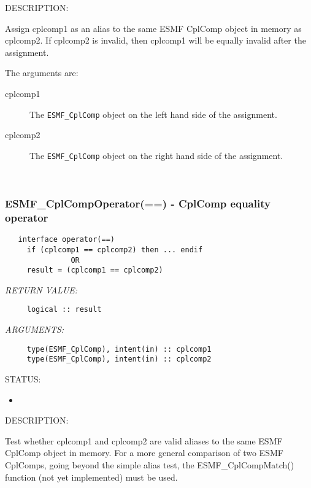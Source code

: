 {\sf DESCRIPTION:\\ }


     Assign cplcomp1 as an alias to the same ESMF CplComp object in memory
     as cplcomp2. If cplcomp2 is invalid, then cplcomp1 will be equally invalid after
     the assignment.
  
     The arguments are:
     \begin{description}
     \item[cplcomp1]
       The {\tt ESMF\_CplComp} object on the left hand side of the assignment.
     \item[cplcomp2]
       The {\tt ESMF\_CplComp} object on the right hand side of the assignment.
     \end{description}
   
 
\mbox{}\hrulefill\ 
 
\subsubsection [ESMF\_CplCompOperator(==)] {ESMF\_CplCompOperator(==) - CplComp equality operator}


  
\begin{verbatim}   interface operator(==)
     if (cplcomp1 == cplcomp2) then ... endif
               OR
     result = (cplcomp1 == cplcomp2)\end{verbatim}{\em RETURN VALUE:}
\begin{verbatim}     logical :: result\end{verbatim}{\em ARGUMENTS:}
\begin{verbatim}     type(ESMF_CplComp), intent(in) :: cplcomp1
     type(ESMF_CplComp), intent(in) :: cplcomp2\end{verbatim}
{\sf STATUS:}
   \begin{itemize}
   \item{}
   \end{itemize}
  
{\sf DESCRIPTION:\\ }


     Test whether cplcomp1 and cplcomp2 are valid aliases to the same ESMF
     CplComp object in memory. For a more general comparison of two ESMF CplComps,
     going beyond the simple alias test, the ESMF\_CplCompMatch() function (not yet
     implemented) must be used.
  
